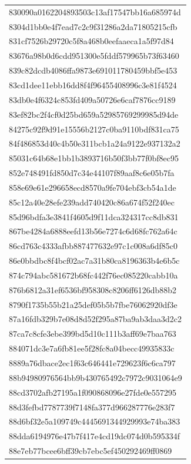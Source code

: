 \begin{tabular}{l}
830090a0162204893503c13af17547bb16a685974d \\
8304d1bb0e4f7ead7c2c9f31286a2da71805215cfb \\
831cf7526b29720c5f8a468b0eefaaeca1a5f97d84 \\
83676a98b0d6cdd951300e5fddf579965b73f63460 \\
839c82dcdb4086ffa9873e691011780459bbf5e453 \\
83cd1dee11ebb16dd8f4f96455408996c3e81f4524 \\
83db0e4f6324c853fd409a50726e6caf7876cc9189 \\
83ef82bc2f4cf0d25bd659a52985769299985d94de \\
84275c92f9d91e15556b2127c0ba9110bdf831ca75 \\
84f486853d40c4b50e311bcb1a24a9122e937132a2 \\
85031c64b68e1bb1b3893716b50f3bb77f0bf8ec95 \\
852e748491fd850d7c34e44107f89aaf8c6e05b7fa \\
858e69e61e296658ecd8570a9fe704ebf3cb54a1de \\
85c12a40e28efe239add740420c86a674f52f240ec \\
85d96bdfa3e3841f4605d9f11dca324317cc8db831 \\
867be4284a6888eefd13b56e7274c6d68fc762a64c \\
86cd763c4333afbb887477632e97c1c008a6df85c0 \\
86e0bbdbc8f4bcf02ac7a31b80ca8196363b4e6b5c \\
874c794abc581672b68fc442f76ec085220cabb10a \\
876b6812a31ef6536bf958308c8206ff6126db88b2 \\
8790f1735b55b21a25def05b5b7fbe76062920df3e \\
87a16fdb329b7e08d8d52f295a87ba9ab3daa3d2c2 \\
87ca7c8cfe3ebe399bd5d10c111b3aff69e7baa763 \\
884071dc3e7a6fb81ee5f28fc8a04becc49935833c \\
8889a76dbace2ec1f63c646441e729623f6c6ca797 \\
88b94980976564bb9b430765492c7972c9031064e9 \\
88cd3702afb27195a1f090868096e27fde0e557295 \\
88d3fefbd7787739f7148fa377d966287776e283f7 \\
88d6bf32e5a109749c4445691344929993e74ba383 \\
88dda6194976e47b7f417e4cd19dc074d0b595334f \\
88e7eb77bcee6bff39cb7ebc5ef450292469ff0869 \\

\end{tabular}

